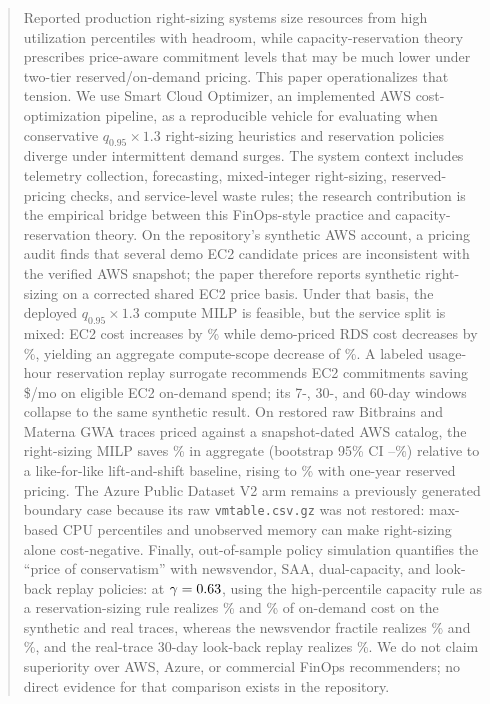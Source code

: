 \documentclass[conference]{IEEEtran}
\begin{document}
    \begin{abstract}
    Reported production right-sizing systems size resources from high
    utilization percentiles with headroom, while capacity-reservation theory prescribes
    price-aware commitment levels that may be much lower under two-tier
    reserved/on-demand pricing. This paper operationalizes that tension. We use
    Smart Cloud Optimizer, an implemented AWS cost-optimization pipeline, as a
    reproducible vehicle for evaluating when conservative
    $q_{0.95}\times1.3$ right-sizing heuristics and reservation policies diverge
    under intermittent demand surges. The system context includes telemetry
    collection, forecasting, mixed-integer right-sizing, reserved-pricing checks,
    and service-level waste rules; the research contribution is the empirical
    bridge between this FinOps-style practice and capacity-reservation theory.
    On the repository's synthetic AWS account, a pricing audit finds that several
    demo EC2 candidate prices are inconsistent with the verified AWS snapshot; the
    paper therefore reports synthetic right-sizing on a corrected shared EC2 price
    basis. Under that basis, the deployed $q_{0.95}\times1.3$ compute MILP is
    feasible, but the service split is mixed: EC2 cost increases by
    \evidEcTwoDeltaPct\% while demo-priced RDS cost decreases by
    \evidRdsSavingsPct\%, yielding an aggregate compute-scope decrease of
    \evidPfiveSavingsPct\%. A labeled usage-hour reservation replay surrogate
    recommends \evidCommercialRecs{} EC2 commitments saving
    \$\evidCommercialSavings{}/mo on eligible EC2 on-demand spend; its 7-, 30-,
    and 60-day windows collapse to the same synthetic result.
    On restored raw Bitbrains and Materna GWA traces priced against a
    snapshot-dated AWS catalog, the right-sizing MILP saves
    \extOverallSavingsPct\% in aggregate (bootstrap 95\% CI
    \extOverallSavingsCiLow--\extOverallSavingsCiHigh\%) relative to a
    like-for-like lift-and-shift baseline, rising to \extOverallSavingsPctRi\%
    with one-year reserved pricing. The Azure Public Dataset V2 arm remains a
    previously generated boundary case because its raw
    \texttt{vmtable.csv.gz} was not restored: max-based CPU percentiles and unobserved memory can
    make right-sizing alone cost-negative. Finally, out-of-sample policy
    simulation quantifies the ``price of conservatism'' with newsvendor, SAA,
    dual-capacity, and look-back replay policies: at
    $\gamma=\polGammaStar$, using the high-percentile capacity rule as a
    reservation-sizing rule realizes \polPctHeur\% and \extPolPctHeur\% of
    on-demand cost on the synthetic and real traces, whereas the newsvendor
    fractile realizes \polPctNv\% and \extPolPctNv\%, and the real-trace
    30-day look-back replay realizes \extPolPctLookThirty\%. We do not claim
    superiority over AWS, Azure, or commercial FinOps recommenders; no direct
    evidence for that comparison exists in the repository.
    \end{abstract}
\end{document}
